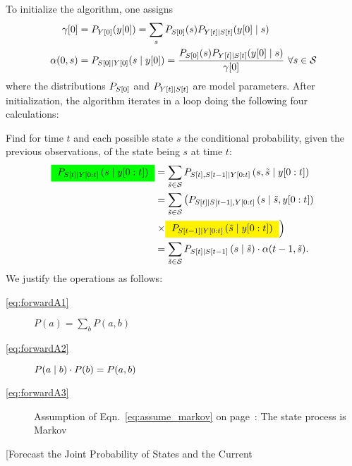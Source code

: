 To initialize the algorithm, one assigns
\begin{align*}
  \ti{\gamma}{0} &= P_{\ti{Y}{0}}(\ti{y}{0}) =
              \sum_{s}P_{\ti{S}{0}}(s)P_{\ti{Y}{t}\given \ti{S}{t}}(\ti{y}{0}\given s)
  \\
  \alpha(0,s) &= P_{\ti{S}{0}\given \ti{Y}{0}}(s\given \ti{y}{0}) =
  \frac{P_{\ti{S}{0}}(s)P_{\ti{Y}{t}\given \ti{S}{t}}(\ti{y}{0}\given s)}
  {\ti{\gamma}{0}}
~\forall s \in \states
\end{align*}
where the distributions $P_{{S}{[0]}}$ and $P_{{Y}{[t]}\mid {S}{[t]}}$
are model parameters.  After initialization, the algorithm iterates in
a loop doing the following four calculations: 
\begin{description}
\item[Forecast the Distribution of States] Find for time $t$ and each
  possible state $s$ the conditional probability, given the
  previous observations, of the state being $s$ at time $t$:
  \begin{subequations}
    \label{eq:forwardA}
    \begin{align}
      \mlabel{eq:forwardA1}
      \StateForecast{S}{s}{t} & = \sum_{{\tilde s}\in\states}
      P_{\ti{S}{t},\ti{S}{t-1}\given \ts{Y}{0}{t}} \left( s, {\tilde s}
      \given \ts{y}{0}{t} \right)\\
      \mlabel{eq:forwardA2}
      & = \sum_{{\tilde s}\in\states} \left(
        P_{\ti{S}{t}\given \ti{S}{t-1},\ts{Y}{0}{t}}
        \left( s\given {\tilde s},\ts{y}{0}{t} \right) \right. \nonumber \\ &
      \left. \times \alphax{S}{t-1}{t}{{\tilde s}} \right) \\
      \mlabel{eq:forwardA3}
      & = \sum_{{\tilde s}\in\states} P_{\ti{S}{t}\given \ti{S}{t-1}} \left( s\given {\tilde s} \right)
      \cdot \alpha(t-1,{\tilde s}) .
    \end{align}
  \end{subequations}
  We justify the operations as follows:
  \begin{description}
  \item[\eqref{eq:forwardA1}] $P(a) = \sum_b P(a,b)$
  \item[\eqref{eq:forwardA2}] $P(a\mid b)\cdot P(b) = P(a,b)$
  \item[\eqref{eq:forwardA3}] Assumption of
    Eqn.~\eqref{eq:assume_markov} on page~\pageref{eq:assume_markov}: The state process is Markov
  \end{description}
\item[Forecast the Joint Probability of States and the Current

\end{description}
